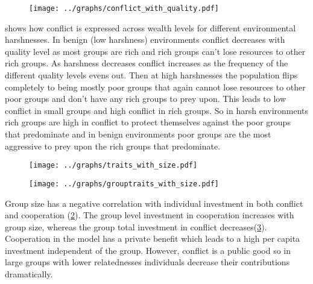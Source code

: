 \begin{figure}[th]
    \texttt{[image: ../graphs/conflict\_with\_quality.pdf]}
    \caption{}
    \label{fig:conflict_quality}
\end{figure}

 shows how conflict is expressed across wealth levels for different environmental harshnesses. In benign (low harshness) environments conflict decreases with quality level as most groups are rich and rich groups can't lose resources to other rich groups. As harshness decreases conflict increases as the frequency of the different quality levels evens out. Then at high harshnesses the population flips completely to being mostly poor groups that again cannot lose resources to other poor groups and don't have any rich groups to prey upon. This leads to low conflict in small groups and high conflict in rich groups. So in harsh environments rich groups are high in conflict to protect themselves against the poor groups that predominate and in benign environments poor groups are the most aggressive to prey upon the rich groups that predominate. 

\begin{figure}[th]
    \texttt{[image: ../graphs/traits\_with\_size.pdf]}
    \caption{} 
    \label{fig:traits_size}
\end{figure}

\begin{figure}[th]
    \texttt{[image: ../graphs/grouptraits\_with\_size.pdf]}
    \caption{} 
    \label{fig:grouptraits_size}
\end{figure}

Group size has a negative correlation with individual investment in both conflict and cooperation (\cref{fig:traits_size}). The group level investment in cooperation increases with group size, whereas the group total investment in conflict decreases(\cref{fig:grouptraits_size}). Cooperation in the model has a private benefit which leads to a high per capita investment independent of the group. However, conflict is a public good so in large groups with lower relatednesses individuals decrease their contributions dramatically.



